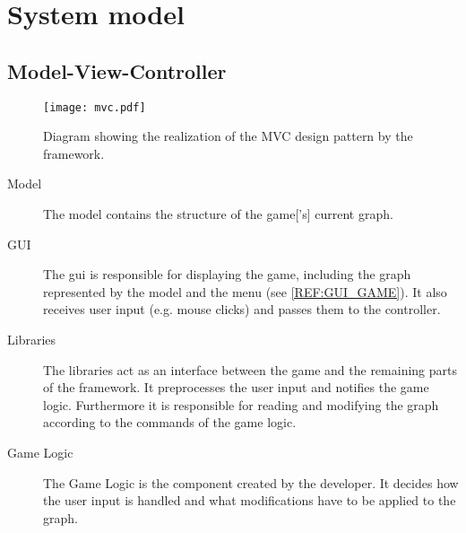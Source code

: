 \section{System model}

\subsection{Model-View-Controller}


\begin{figure}[h]
	\centering
	\texttt{[image: mvc.pdf]}
	\caption{Diagram showing the realization of the \gls{MVC} design pattern by the framework.}
	\label{img:MVC}
\end{figure}

\begin{description}
\item[Model] The model contains the structure of the \gls{game}['s] current \gls{graph}.
\item[GUI] The \gls{gui} is responsible for displaying the game, including the \gls{graph} represented by the model and the menu (see \ref{REF:GUI_GAME}). It also receives user input (e.g. mouse clicks) and passes them to the controller.
\item[Libraries] The libraries act as an interface between the game and the remaining parts of the framework. It preprocesses the user input and notifies the game logic. Furthermore it is responsible for reading and modifying the \gls{graph} according to the commands of the game logic.
\item[Game Logic] The Game Logic is the component created by the \gls{developer}. It decides how the user input is handled and what modifications have to be applied to the \gls{graph}.
\end{description}

